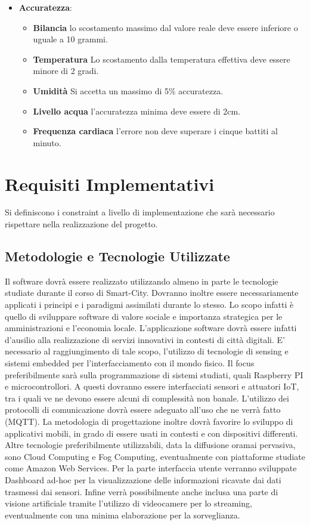 \begin{itemize}
\begin{itemize}
            \end{itemize}
        \item \textbf{Accuratezza}:
            \begin{itemize}
                \item \textbf{Bilancia} lo scostamento massimo dal valore reale deve essere inferiore o uguale a 10 grammi.
                \item \textbf{Temperatura}  Lo scostamento dalla temperatura effettiva deve essere minore di 2 gradi.
                \item \textbf{Umidità} Si accetta un massimo di 5\% accuratezza.
                \item \textbf{Livello acqua} l'accuratezza minima deve essere di 2cm.
                \item \textbf{Frequenza cardiaca} l'errore non deve superare i cinque battiti al minuto.
            \end{itemize}
    \end{itemize}    
    

	\section{Requisiti Implementativi}
	Si definiscono i constraint a livello di implementazione che sarà necessario rispettare nella realizzazione del progetto.
	
	\subsection{Metodologie e Tecnologie Utilizzate}
	Il software dovrà essere realizzato utilizzando almeno in parte le tecnologie studiate durante il corso di Smart-City. Dovranno inoltre essere necessariamente applicati i principi e i paradigmi assimilati durante lo stesso. Lo scopo infatti è quello di sviluppare software di valore sociale e importanza strategica per le amministrazioni e l'economia locale. L'applicazione software dovrà essere infatti d'ausilio alla realizzazione di servizi innovativi in contesti di città digitali.
	E' necessario al raggiungimento di tale scopo, l'utilizzo di tecnologie di sensing e sistemi embedded per l'interfacciamento con il mondo fisico. Il focus preferibilmente sarà sulla programmazione di sistemi studiati, quali Raspberry PI e microcontrollori.
	A questi dovranno essere interfacciati sensori e attuatori IoT, tra i quali ve ne devono essere alcuni di complessità non banale.
	L'utilizzo dei protocolli di comunicazione dovrà essere adeguato all'uso che ne verrà fatto (MQTT).
	La metodologia di progettazione inoltre dovrà favorire lo sviluppo di applicativi mobili, in grado di essere usati in contesti e con dispositivi differenti.
	Altre tecnologie preferibilmente utilizzabili, data la diffusione oramai pervasiva, sono Cloud Computing e Fog Computing, eventualmente con piattaforme studiate come Amazon Web Services.
	Per la parte interfaccia utente verranno sviluppate Dashboard ad-hoc per la visualizzazione delle informazioni ricavate dai dati trasmessi dai sensori.
	Infine verrà possibilmente anche inclusa una parte di visione artificiale tramite l'utilizzo di videocamere per lo streaming, eventualmente con una minima elaborazione per la sorveglianza.
	